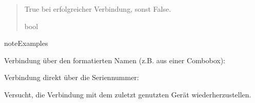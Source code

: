 \documentclass[letterpaper,10pt,english]{sphinxmanual}
\begin{document}
\begin{fulllineitems}
\begin{fulllineitems}
\begin{quote}
\begin{description}
\sphinxAtStartPar
True bei erfolgreicher Verbindung, sonst False.

\sphinxAtStartPar
bool

\end{description}\end{quote}

\begin{sphinxadmonition}{note}{Examples}

\sphinxAtStartPar
Verbindung über den formatierten Namen (z.B. aus einer Combobox):

\begin{sphinxVerbatim}[commandchars=\\\{\}]
  
  
 
     
\end{sphinxVerbatim}

\sphinxAtStartPar
Verbindung direkt über die Seriennummer:

\begin{sphinxVerbatim}[commandchars=\\\{\}]
  
\end{sphinxVerbatim}
\end{sphinxadmonition}

\end{fulllineitems}


\begin{fulllineitems}
\label{\detokenize{modulab/spectrometer_manager:modules.spectrometer.SpectrometerManager.SpectrometerManager.connect_LastDevice}}
\pysigstartsignatures
\pysiglinewithargsret
{}
{}
{}
\pysigstopsignatures
\sphinxAtStartPar
Versucht, die Verbindung mit dem zuletzt genutzten Gerät wiederherzustellen.


\end{fulllineitems}
\end{fulllineitems}
\end{document}

